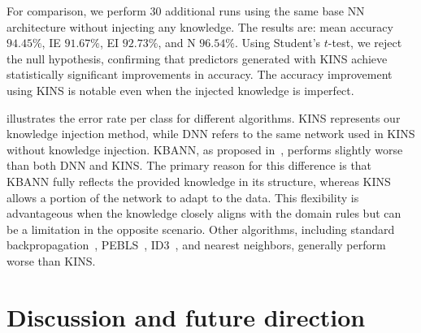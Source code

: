 For comparison, we perform $30$ additional runs using the same base \gls{NN} architecture without injecting any knowledge.
%
The results are: mean accuracy \(94.45\%\), \gls{IE} \(91.67\%\), \gls{EI} \(92.73\%\), and N \(96.54\%\).
%
Using Student's \(t\)-test, we reject the null hypothesis, confirming that predictors generated with \gls{KINS} achieve statistically significant improvements in accuracy.
%
The accuracy improvement using \gls{KINS} is notable even when the injected knowledge is imperfect.

 illustrates the error rate per class for different algorithms.
%
\gls{KINS} represents our knowledge injection method, while \gls{DNN} refers to the same network used in \gls{KINS} without knowledge injection.
%
\Gls{KBANN}, as proposed in~\cite{DBLP:journals/ai/TowellS94}, performs slightly worse than both \gls{DNN} and \gls{KINS}.
%
The primary reason for this difference is that \gls{KBANN} fully reflects the provided knowledge in its structure, whereas \gls{KINS} allows a portion of the network to adapt to the data.
%
This flexibility is advantageous when the knowledge closely aligns with the domain rules but can be a limitation in the opposite scenario.
%
Other algorithms, including standard backpropagation~\cite{rumelhart1987learning}, \gls{PEBLS}~\cite{DBLP:journals/ml/CostS93}, ID3~\cite{quinlan1986induction}, and nearest neighbors, generally perform worse than \gls{KINS}.


\section{Discussion and future direction}\label{sec:ski-discussion-and-future-direction}
